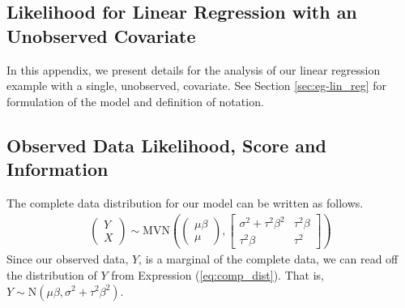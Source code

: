 \documentclass[11pt, oneside]{article}   	%
\begin{document}

\newpage

\begin{appendices}
    \section{Likelihood for Linear Regression with an Unobserved Covariate}

    In this appendix, we present details for the analysis of our linear regression example with a single, unobserved, covariate. See Section \ref{sec:eg-lin_reg} for formulation of the model and definition of notation.

    \subsection{Observed Data Likelihood, Score and Information}

    The complete data distribution for our model can be written as follows.
    \begin{align}
        \begin{pmatrix} Y \\ X \end{pmatrix} 
        \sim \mathrm{MVN}\left( \begin{pmatrix}
            \mu \beta\\
            \mu
        \end{pmatrix}, \begin{bmatrix}
            \sigma^2 + \tau^2 \beta^2 & \tau^2 \beta\\
            \tau^2 \beta & \tau^2
        \end{bmatrix} \right) \label{eq:comp_dist}
    \end{align}
    Since our observed data, $Y$, is a marginal of the complete data, we can read off the distribution of $Y$ from Expression (\ref{eq:comp_dist}). That is, $Y \sim \mathrm{N}(\mu \beta, \sigma^2 + \tau^2 \beta^2)$.


\end{appendices}
\end{document}
